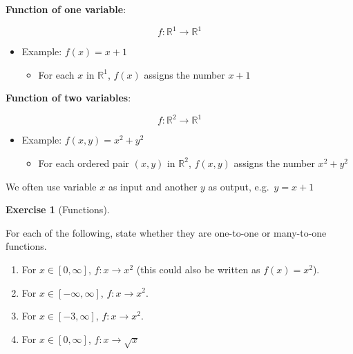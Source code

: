 \documentclass[
  letterpaper,
]{book}
\providecommand{\tightlist}{%
  \setlength{\itemsep}{0pt}\setlength{\parskip}{0pt}}\usepackage{longtable,booktabs,array}
\theoremstyle{definition}
\theoremstyle{definition}
\theoremstyle{plain}
\theoremstyle{definition}
\newtheorem{exercise}{Exercise}[chapter]
\theoremstyle{plain}
\theoremstyle{plain}
\theoremstyle{remark}
\begin{document}
\begin{tcolorbox}[enhanced jigsaw, colframe=quarto-callout-important-color-frame, breakable, arc=.35mm, leftrule=.75mm, opacitybacktitle=0.6, titlerule=0mm, colbacktitle=quarto-callout-important-color!10!white, bottomtitle=1mm, coltitle=black, bottomrule=.15mm, colback=white, opacityback=0, toptitle=1mm, left=2mm, rightrule=.15mm, toprule=.15mm, title=\textcolor{quarto-callout-important-color}{\faExclamation}\hspace{0.5em}{Notation (Functions)}]

\textbf{Function of one variable}:

\[
f:\mathbb{R}^1\to\mathbb{R}^1
\]

\begin{itemize}
\tightlist
\item
  Example: \(f(x)=x+1\)

  \begin{itemize}
  \tightlist
  \item
    For each \(x\) in \(\mathbb{R}^1\), \(f(x)\) assigns the number
    \(x+1\)
  \end{itemize}
\end{itemize}

\textbf{Function of two variables}:

\[
f: \mathbb{R}^2\to\mathbb{R}^1
\]

\begin{itemize}
\tightlist
\item
  Example: \(f(x,y)=x^2+y^2\)

  \begin{itemize}
  \tightlist
  \item
    For each ordered pair \((x,y)\) in \(\mathbb{R}^2\), \(f(x,y)\)
    assigns the number \(x^2+y^2\)
  \end{itemize}
\end{itemize}

\end{tcolorbox}

We often use variable \(x\) as input and another \(y\) as output,
e.g.~\(y=x+1\)

\leavevmode{}%
\begin{exercise}[Functions]\label{exr-functions}

For each of the following, state whether they are one-to-one or
many-to-one functions.

\begin{enumerate}
\def\labelenumi{\arabic{enumi}.}
\tightlist
\item
  For \(x \in [0,\infty]\), \(f : x \rightarrow x^2\) (this could also
  be written as \(f(x) = x^2\)).
\item
  For \(x \in [-\infty, \infty]\), \(f: x \rightarrow x^2\).
\item
  For \(x \in [-3, \infty]\), \(f: x \rightarrow x^2\).
\item
  For \(x \in [0, \infty]\), \(f: x \rightarrow \sqrt{x}\)
\end{enumerate}

\end{exercise}
\end{document}
